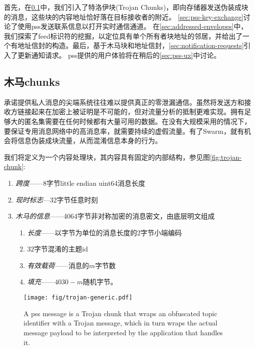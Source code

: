 首先，在\ref{sec:trojan}中，我们引入了特洛伊块(Trojan Chunks)，即向存储器发送伪装成块的消息，这些块的内容地址恰好落在目标接收者的附近。 
\ref{sec:pss-key-exchange}讨论了使用pss发送联系信息以打开实时通信通道。
在\ref{sec:addressed-envelopes}中，我们探索了feed标识符的挖掘，以定位具有单个所有者块地址的邻居，并给出了一个有地址信封的构造。最后，基于木马块和地址信封，\ref{sec:notification-requests}引入了更新通知请求。
pss提供的用户体验将在稍后的\ref{sec:pss-ux}中讨论。 

\subsection{木马chunks\statusgreen}\label{sec:trojan}

承诺提供私人消息的尖端系统往往难以提供真正的零泄漏通信\cite{kwon2016riffle}。虽然将发送方和接收方链接起来在加密上被证明是不可能的，但对流量分析的抵制更难实现。拥有足够大的匿名集需要在任何时候都有大量可用的数据。在没有大规模采用的情况下，要保证专用消息网络中的高消息率，就需要持续的虚假流量。有了Swarm，就有机会将信息伪装成块流量，从而混淆信息本身的行为。 

我们将定义为一个内容处理块，其内容具有固定的内部结构，参见图\ref{fig:trojan-chunk}:

\begin{enumerate}
    \item \emph{跨度}——8字节little endian uint64消息长度  
    \item \emph{现时标志}—32字节任意时刻 
    \item \emph{木马的信息}——4064字节非对称加密的消息密文，由底层明文组成
    \begin{enumerate}
        \item \emph{长度}——以字节为单位的消息长度的2字节小端编码
        \item $32$字节混淆的主题id   
        \item \emph{有效载荷}——消息的$m$字节数 
        \item \emph{填充}——$4030-m$随机字节。
    \end{enumerate}
\end{enumerate}

\begin{figure}[htbp]
\centering
\texttt{[image: fig/trojan-generic.pdf]}
\caption[Trojan chunk or pss message\statusgreen]{A pss message is a Trojan chunk that wraps an obfuscated topic identifier with a Trojan message, which in turn wraps the actual message payload to be interpreted by the application that handles it.}
\label{fig:trojan-generic}
\end{figure}

